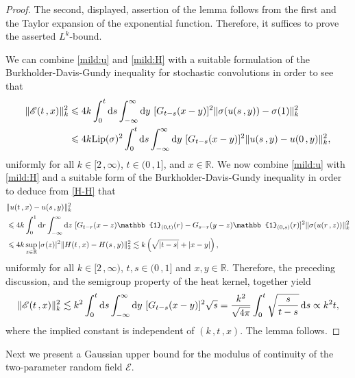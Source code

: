 \documentclass[reqno]{amsart}
\newcommand{\<}{\langle}
\renewcommand{\>}{\rangle}
\newcommand{\R}{\mathbb{R}}
\newcommand{\lip}{\text{Lip}}
\newcommand{\1}{\mathbb{1}}
\renewcommand{\d}{{\rm d}}
\renewcommand{\le}{\leqslant}
\theoremstyle{definition}
\numberwithin{equation}{section}
\begin{document}
\begin{proof}
	The second, displayed, assertion of the lemma follows from the first 
	and the Taylor expansion of the exponential function. Therefore, it suffices
	to prove the asserted $L^k$-bound.
	
	We can combine \eqref{mild:u} and \eqref{mild:H}
	with a suitable formulation of the
	Burkholder-Davis-Gundy inequality for stochastic convolutions
	\cite[Proposition 5.2]{CBMS} in order to see that
	\begin{align*}
		\|\mathscr{E}(t\,,x)\|_k^2 &\le 4k \int_0^t \d s
			\int_{-\infty}^\infty\d y\ [G_{t-s}(x-y)]^2
			\|\sigma(u(s\,,y))-\sigma(1)\|_k^2\\
		&\le 4k\lip(\sigma)^2 \int_0^t\d s \int_{-\infty}^\infty\d y\ 
			[G_{t-s}(x-y)]^2
			\|u(s\,,y)-u(0\,,y)\|_k^2,
	\end{align*}
	uniformly for all $k \in [2\,,\infty)$, $t \in (0\,,1]$, and $x \in \R$.
	We now combine \eqref{mild:u} with \eqref{mild:H}
	and a suitable form of the Burkholder-Davis-Gundy inequality
	\cite[Proposition 5.2]{CBMS}
	in order to deduce from \eqref{H-H} that
	\begin{align}
		&\|u(t\,,x)-u(s\,,y)\|_k^2\notag \\
		& \le 4k \int_0^1 \d r \int_{-\infty}^\infty \d z \ 
			[G_{t-r}(x-z) \1_{(0,t)}(r) - G_{s-r}(y-z) \1_{(0,s)}(r)]^2 
			\|\sigma(u(r\,,z))\|_k^2\notag \\
		&\le 4k \sup_{z \in \R} |\sigma(z)|^2  
			\| H(t\,,x)-H(s\,,y)\|_2^2 \lesssim k \left(\sqrt{|t-s|} + |x-y|\right),
		\label{u-u}
	\end{align}
	uniformly for all $k \in [2\,,\infty)$, $t,s \in (0\,,1]$ 
	and $x, y \in\R$. Therefore, the preceding discussion, and the semigroup property
	of the heat kernel, together yield
	\[
		\|\mathscr{E}(t\,,x)\|_k^2 
		\lesssim k^2 \int_0^t\d s \int_{-\infty}^\infty
		\d y\ [G_{t-s}(x-y)]^2\sqrt{s}
		= \frac{k^2}{\sqrt{4\pi}}
		\int_0^t\sqrt{\frac{s}{t-s}}\,\d s
		\propto k^2 t,
	\]
	where the implied constant is independent of $(k\,,t\,,x)$.
	The lemma follows.
\end{proof}

Next we present a Gaussian upper bound
for the modulus of continuity of the two-parameter random field
$\mathscr{E}$.
\end{document}
